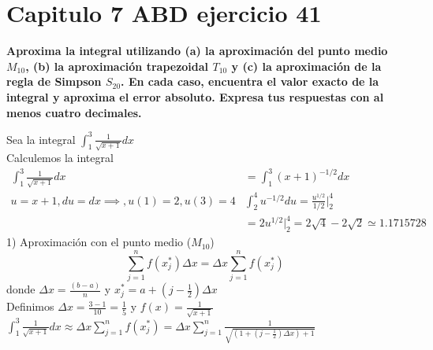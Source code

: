\chapter*{Capitulo 7 ABD ejercicio 41}
\textbf{Aproxima la integral utilizando (a) la aproximación del punto medio $M_{10}$, (b) la aproximación trapezoidal $T_{10}$ y (c) la aproximación de la regla de Simpson $S_{20}$. En cada caso, encuentra el valor exacto de la integral y aproxima el error absoluto. Expresa tus respuestas con al menos cuatro decimales.}

Sea la integral $\displaystyle \int_{1}^{3}\frac{1}{\sqrt{x+1}}dx$\\
Calculemos la integral
\begin{align*}
	\int_{1}^{3}\frac{1}{\sqrt{x+1}}dx & =\int_{1}^{3}(x+1)^{-1/2}dx                             \\
	u=x+1, du=dx\implies,u(1)=2,u(3)=4 & \int_{2}^{4}u^{-1/2}du=\frac{u^{1/2}}{1/2}\bigg|_2^4    \\
	                                   & =2u^{1/2}\bigg|_2^4=2\sqrt{4}-2\sqrt{2}\simeq 1.1715728
\end{align*}
1) Aproximación con el punto medio ($M_{10}$)
\[\sum_{j=1}^{n}f(x^*_j)\Delta x=\Delta x\sum_{j=1}^{n}f(x^*_j)\]
donde $\Delta x = \frac{(b-a)}{n}$ y $x_j^*=a+(j-\frac{1}{2})\Delta x$\\
Definimos $\Delta x =\frac{3-1}{10}=\frac{1}{5}$ y $f(x)=\frac{1}{\sqrt{x+1}}$\\
$\displaystyle \int_{1}^{3}\frac{1}{\sqrt{x+1}}dx\approx \Delta x\sum_{j=1}^{n}f(x_j^*)=\Delta x\sum_{j=1}^{n}\frac{1}{\sqrt{(1+(j-\frac{1}{2})\Delta x)+1}}$

